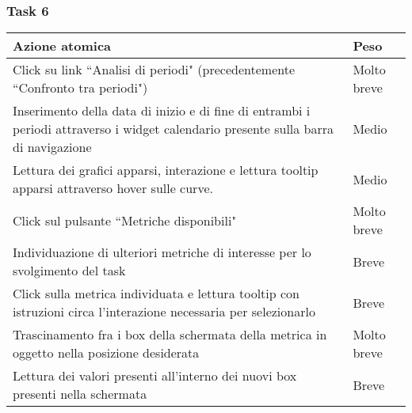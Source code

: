 \subsubsection{Task 6}
\label{sss:iaa-task-6}

{
\renewcommand{\arraystretch}{2}
\begin{longtable}[h]{| p{14cm} | p{2.5cm} |}
    \hline
    \textbf{Azione atomica} & \textbf{Peso} \\
    \hline
    \endhead
    Click su link ``Analisi di periodi" (precedentemente ``Confronto tra periodi") & Molto breve \\
    \hline
    Inserimento della data di inizio e di fine di entrambi i periodi attraverso i widget calendario presente sulla barra di navigazione & Medio \\
    \hline
    Lettura dei grafici apparsi, interazione e lettura tooltip apparsi attraverso hover sulle curve. & Medio \\
    \hline
    Click sul pulsante ``Metriche disponibili" & Molto breve \\
    \hline
    Individuazione di ulteriori metriche di interesse per lo svolgimento del task & Breve \\
    \hline
    Click sulla metrica individuata e lettura tooltip con istruzioni circa l'interazione necessaria per selezionarlo & Breve \\
    \hline
    Trascinamento fra i box della schermata della metrica in oggetto nella posizione desiderata & Molto breve \\
    \hline
    Lettura dei valori presenti all'interno dei nuovi box presenti nella schermata & Breve \\
    \hline
\end{longtable}
}
